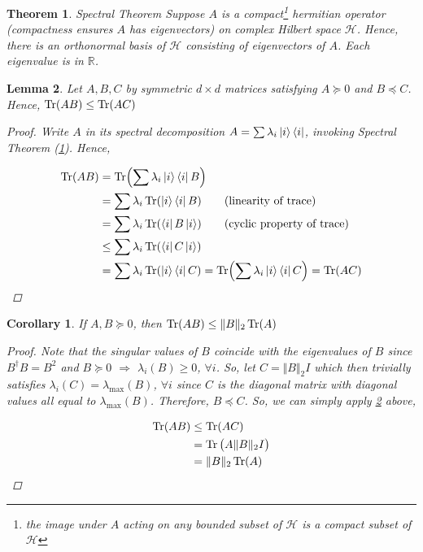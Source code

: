 \documentclass[11pt]{article}
\newcommand\0{\mathbf{0}}
\newcommand\RR{\mathbb{R}}
\newcommand\<{\langle}
\renewcommand\>{\rangle}
\renewcommand\implies{\Rightarrow}
\newtheorem{theorem}{Theorem}[section]
\newtheorem{corollary}{Corollary}[theorem]
\newtheorem{lemma}[theorem]{Lemma}
\begin{document}
\begin{theorem}Spectral Theorem
\label{thm:spec}
Suppose $A$ is a compact\footnote{the image under $A$ acting on any bounded subset of $\mathcal{H}$ is a compact subset of $\mathcal{H}$} hermitian operator (compactness ensures $A$ has eigenvectors) on complex Hilbert space $\mathcal{H}$. Hence, there is an orthonormal basis of $\mathcal{H}$ consisting of eigenvectors of $A$. Each eigenvalue is in $\RR$.	
\end{theorem}

\begin{lemma}
\label{lem:psd-trace}
Let $A, B, C$ by symmetric $d \times d$ matrices satisfying $A \succeq 0$ and $B \preceq C$. Hence, $\Tr(AB) \leq \Tr(AC)$

\begin{proof}
	Write $A$ in its spectral decomposition $A = \sum \lambda_i \ket{i}\bra{i}$, invoking Spectral Theorem (\ref{thm:spec}). Hence,
	
	\begin{align*}
		\Tr(AB) &= \Tr(\sum \lambda_i \ket{i}\bra{i} B)\\
		&= \sum \lambda_i \Tr(\ket{i}\bra{i} B) \tag{linearity of trace}\\
		&= \sum \lambda_i \Tr(\bra{i} B \ket{i}) \tag{cyclic property of trace}\\
		&\leq \sum \lambda_i \Tr(\bra{i} C \ket{i})\\
		&= \sum \lambda_i \Tr(\ket{i}\bra{i} C) = \Tr(\sum \lambda_i \ket{i}\bra{i} C) = \Tr(AC)
	\end{align*}
\end{proof}
\end{lemma}

\begin{corollary}
\label{cor:psd-tr-norm-ineq}
If $A, B \succeq 0$, then $\Tr(AB) \leq \Vert B \Vert_2 \Tr(A)$

\begin{proof}
Note that the singular values of $B$ coincide with the eigenvalues of $B$ since $B^\dag B = B^2$ and $B \succeq 0$ $\implies$ $\lambda_i(B) \geq 0$, $\forall i$. So, let $C = \Vert B \Vert_2 I$ which then trivially satisfies $\lambda_i(C) = \lambda_{\max}(B)$, $\forall i$ since $C$ is the diagonal matrix with diagonal values all equal to $\lambda_{\max}(B)$. Therefore, $B \preceq C$. So, we can simply apply \ref{lem:psd-trace} above,

\begin{align*}
\Tr(AB) &\leq \Tr(AC) \\
&= \Tr\big(A \Vert B \Vert_2 I\big)\\
&= \Vert B \Vert_2 \Tr(A)
\end{align*}
\end{proof}
\end{corollary}
\end{document}
